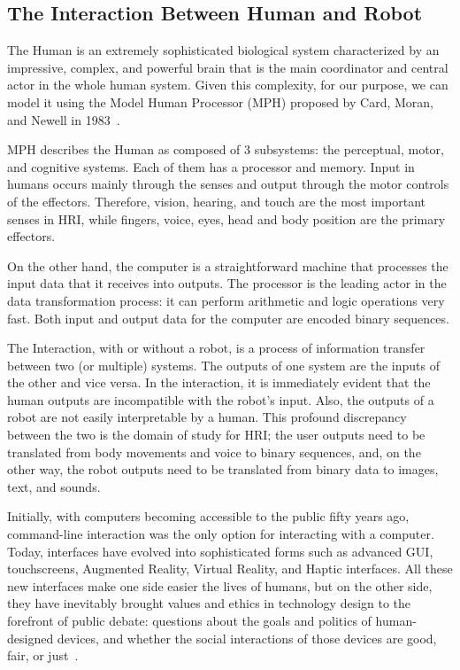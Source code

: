 \subsection{The Interaction Between Human and Robot}\label{subsec:the_interaction}
The Human is an extremely sophisticated biological system characterized by an impressive, complex, and powerful brain that is the main
coordinator and central actor in the whole human system. Given this complexity, for our purpose, we can model it using
the Model Human Processor (MPH) proposed by Card, Moran, and Newell in 1983~\cite{card1986model}. 

MPH describes the Human as composed of 3 subsystems: the perceptual, motor, and cognitive systems. 
Each of them has a processor and memory.
Input in humans occurs mainly through the senses and output through the motor controls of the effectors\cite{dix2010human}. 
Therefore, vision, hearing, and touch are the most important senses in HRI, while fingers, voice, eyes, 
head and body position are the primary effectors.

On the other hand, the computer is a straightforward machine that processes the input data that it receives into outputs. 
The processor is the leading actor in the data transformation process: it can perform arithmetic and logic operations very fast. 
Both input and output data for the computer are encoded binary sequences.

The Interaction, with or without a robot, is a process of information transfer between two (or multiple) systems. 
The outputs of one system are the inputs of the other and vice versa. 
In the interaction, it is immediately evident that the human outputs are incompatible with the robot's input. 
Also, the outputs of a robot are not easily interpretable by a human. 
This profound discrepancy between the two is the domain of study for HRI; the user outputs need to be translated from body movements and voice to binary sequences, and, on the other way, the robot outputs need to be translated from binary data to images, text, and sounds.

Initially, with computers becoming accessible to the public fifty years ago, command-line interaction was the only option for interacting with a computer. 
Today, interfaces have evolved into sophisticated forms such as advanced GUI, touchscreens, Augmented Reality, Virtual Reality, and Haptic interfaces. 
All these new interfaces make one side easier the lives of humans, but on the other side, they have inevitably brought values 
and ethics in technology design to the forefront of public debate: questions about the goals and politics of human-designed devices, 
and whether the social interactions of those devices are good, fair, or just~\cite{shilton2018hciEthics}. 

